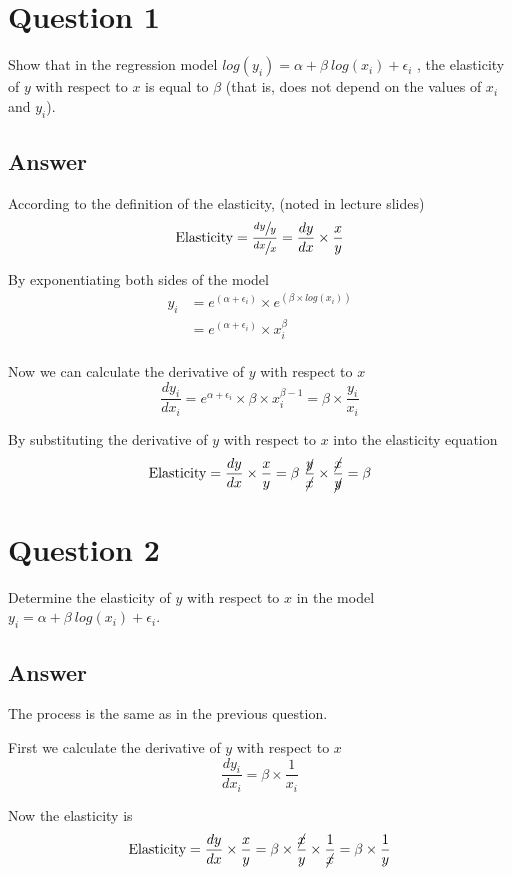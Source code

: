 \documentclass[12pt]{article}
\begin{document}
\section*{Question 1}
Show that in the regression model $log(y_i) = \alpha + \beta\ log(x_i) + \epsilon_i$ , the elasticity of $y$ with respect to $x$ is equal to $\beta$ (that is, does not depend on the values of $x_i$ and $y_i$).

\subsection*{Answer}

According to the definition of the elasticity, (noted in lecture slides)
\[
    \text{Elasticity} = \frac{\sfrac{dy}{y}}{\sfrac{dx}{x}} = \frac{dy}{dx} \times \frac{x}{y}
\]

By exponentiating both sides of the model
\begin{align*}
    y_i &= e^{(\alpha + \epsilon_i)} \times e^{(\beta \times log(x_i))}\\
        &= e^{(\alpha + \epsilon_i)} \times x_i^\beta\\
\end{align*}

Now we can calculate the derivative of $y$ with respect to $x$
\[
    \frac{d y_i}{d x_i} = e^{\alpha + \epsilon_i} \times \beta \times x_i^{\beta - 1} = \beta \times \frac{y_i}{x_i}
\]

By substituting the derivative of $y$ with respect to $x$ into the elasticity equation
\[
    \text{Elasticity} = \frac{dy}{dx} \times \frac{x}{y} = \beta\ \frac{\cancel{y}}{\cancel{x}} \times \frac{\cancel{x}}{\cancel{y}} = \beta
\]

\newpage
\section*{Question 2}
Determine the elasticity of $y$ with respect to $x$ in the model $y_i = \alpha + \beta\ log(x_i) + \epsilon_i$.

\subsection*{Answer}
The process is the same as in the previous question.

First we calculate the derivative of $y$ with respect to $x$
\[
    \frac{d y_i}{d x_i} = \beta \times \frac{1}{x_i}
\]

Now the elasticity is
\[
    \text{Elasticity} = \frac{dy}{dx} \times \frac{x}{y} = \beta \times \frac{\cancel{x}}{y} \times \frac{1}{\cancel{x}} = \beta \times \frac{1}{y}
\]
\end{document}
